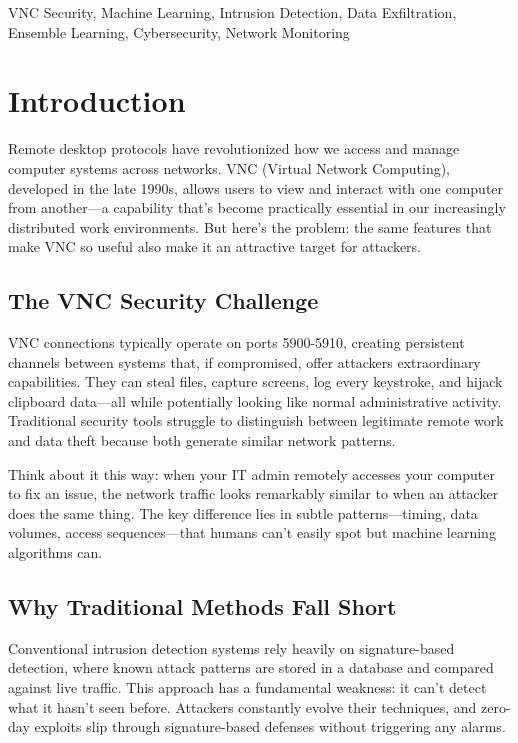 \documentclass[conference]{IEEEtran}
\begin{document}
\begin{IEEEkeywords}
VNC Security, Machine Learning, Intrusion Detection, Data Exfiltration, Ensemble Learning, Cybersecurity, Network Monitoring
\end{IEEEkeywords}

\section{Introduction}

Remote desktop protocols have revolutionized how we access and manage computer systems across networks. VNC (Virtual Network Computing), developed in the late 1990s, allows users to view and interact with one computer from another—a capability that's become practically essential in our increasingly distributed work environments. But here's the problem: the same features that make VNC so useful also make it an attractive target for attackers.

\subsection{The VNC Security Challenge}

VNC connections typically operate on ports 5900-5910, creating persistent channels between systems that, if compromised, offer attackers extraordinary capabilities. They can steal files, capture screens, log every keystroke, and hijack clipboard data—all while potentially looking like normal administrative activity. Traditional security tools struggle to distinguish between legitimate remote work and data theft because both generate similar network patterns.

Think about it this way: when your IT admin remotely accesses your computer to fix an issue, the network traffic looks remarkably similar to when an attacker does the same thing. The key difference lies in subtle patterns—timing, data volumes, access sequences—that humans can't easily spot but machine learning algorithms can.

\subsection{Why Traditional Methods Fall Short}

Conventional intrusion detection systems rely heavily on signature-based detection, where known attack patterns are stored in a database and compared against live traffic. This approach has a fundamental weakness: it can't detect what it hasn't seen before. Attackers constantly evolve their techniques, and zero-day exploits slip through signature-based defenses without triggering any alarms.
\end{document}
